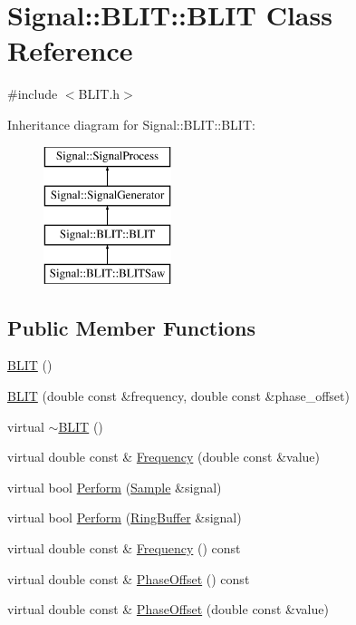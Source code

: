 \hypertarget{classSignal_1_1BLIT_1_1BLIT}{\section{Signal\+:\+:B\+L\+I\+T\+:\+:B\+L\+I\+T Class Reference}
\label{classSignal_1_1BLIT_1_1BLIT}
}


{\ttfamily \#include $<$B\+L\+I\+T.\+h$>$}

Inheritance diagram for Signal\+:\+:B\+L\+I\+T\+:\+:B\+L\+I\+T\+:\begin{figure}[H]
\begin{center}
\leavevmode
\includegraphics[height=4.000000cm]{classSignal_1_1BLIT_1_1BLIT}
\end{center}
\end{figure}
\subsection*{Public Member Functions}
\begin{DoxyCompactItemize}
\item 
\hyperlink{classSignal_1_1BLIT_1_1BLIT_ad22461c308981ee86ddc8b992bfbaf27}{B\+L\+I\+T} ()
\item 
\hyperlink{classSignal_1_1BLIT_1_1BLIT_af4f90ac6dfddc173dd0b381f6582dac9}{B\+L\+I\+T} (double const \&frequency, double const \&phase\+\_\+offset)
\item 
virtual \hyperlink{classSignal_1_1BLIT_1_1BLIT_a9355800dce797a6d35d8bbfc7eb9b834}{$\sim$\+B\+L\+I\+T} ()
\item 
virtual double const \& \hyperlink{classSignal_1_1BLIT_1_1BLIT_a59110620478308054d4c932c613e5cc6}{Frequency} (double const \&value)
\item 
virtual bool \hyperlink{classSignal_1_1BLIT_1_1BLIT_a98982b34bc6c9ca4c2e91550afa31375}{Perform} (\hyperlink{classSignal_1_1Sample}{Sample} \&signal)
\item 
virtual bool \hyperlink{classSignal_1_1BLIT_1_1BLIT_a2f0ee604ed0e67557aa9f7e7f50d80ec}{Perform} (\hyperlink{classSignal_1_1RingBuffer}{Ring\+Buffer} \&signal)
\item 
virtual double const \& \hyperlink{classSignal_1_1SignalGenerator_a96af42ee68f94e9b04d034fd68b73ecd}{Frequency} () const 
\item 
virtual double const \& \hyperlink{classSignal_1_1SignalGenerator_ac2538ec946f001e394d2416fda698d1c}{Phase\+Offset} () const 
\item 
virtual double const \& \hyperlink{classSignal_1_1SignalGenerator_ac6a103ff72beaa338f6d18c812522d78}{Phase\+Offset} (double const \&value)
\end{DoxyCompactItemize}
